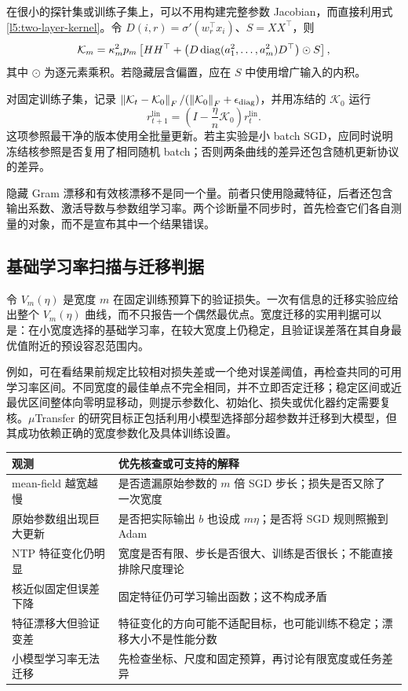 在很小的探针集或训练子集上，可以不用构建完整参数 Jacobian，而直接利用式 \eqref{l5:two-layer-kernel}。令
$D(i,r)=\sigma'(w_r^\top x_i)$、$S=XX^\top$，则
\begin{equation}
 \mathcal K_m
 =\kappa_m^2p_m
 \left[HH^\top+
 \left(D\operatorname{diag}(a_1^2,\ldots,a_m^2)D^\top\right)\odot S\right],
 \label{l5:kernel-computation}
\end{equation}
其中 $\odot$ 为逐元素乘积。若隐藏层含偏置，应在 $S$ 中使用增广输入的内积。

对固定训练子集，记录
$\left\lVert\mathcal K_t-\mathcal K_0\right\rVert_F/(\left\lVert\mathcal K_0\right\rVert_F+
\epsilon_{\mathrm{diag}})$，并用冻结的 $\mathcal K_0$ 运行
\[
 r_{t+1}^{\mathrm{lin}}
 =\left(I-\frac\eta n\mathcal K_0\right)r_t^{\mathrm{lin}}.
\]
这项参照最干净的版本使用全批量更新。若主实验是小 batch SGD，应同时说明冻结核参照是否复用了相同随机 batch；否则两条曲线的差异还包含随机更新协议的差异。

隐藏 Gram 漂移和有效核漂移不是同一个量。前者只使用隐藏特征，后者还包含输出系数、激活导数与参数组学习率。两个诊断量不同步时，首先检查它们各自测量的对象，而不是宣布其中一个结果错误。

\subsection{基础学习率扫描与迁移判据}

令 $V_m(\eta)$ 是宽度 $m$ 在固定训练预算下的验证损失。一次有信息的迁移实验应给出整个 $V_m(\eta)$ 曲线，而不只报告一个偶然最优点。宽度迁移的实用判据可以是：在小宽度选择的基础学习率，在较大宽度上仍稳定，且验证误差落在其自身最优值附近的预设容忍范围内。

例如，可在看结果前规定比较相对损失差或一个绝对误差阈值，再检查共同的可用学习率区间。不同宽度的最佳单点不完全相同，并不立即否定迁移；稳定区间或近最优区间整体向零明显移动，则提示参数化、初始化、损失或优化器约定需要复核。$\mu$Transfer 的研究目标正包括利用小模型选择部分超参数并迁移到大模型，但其成功依赖正确的宽度参数化及具体训练设置\citep{Yang2022}。

\begin{center}
\begin{tabularx}{\textwidth}{@{}p{}X@{}}
\toprule
观测 & 优先核查或可支持的解释 \\
\midrule
mean-field 越宽越慢 & 是否遗漏原始参数的 $m$ 倍 SGD 步长；损失是否又除了一次宽度 \\
原始参数组出现巨大更新 & 是否把实际输出 $b$ 也设成 $m\eta$；是否将 SGD 规则照搬到 Adam \\
NTP 特征变化仍明显 & 宽度是否有限、步长是否很大、训练是否很长；不能直接排除尺度理论 \\
核近似固定但误差下降 & 固定特征仍可学习输出函数；这不构成矛盾 \\
特征漂移大但验证变差 & 特征变化的方向可能不适配目标，也可能训练不稳定；漂移大小不是性能分数 \\
小模型学习率无法迁移 & 先检查坐标、尺度和固定预算，再讨论有限宽度或任务差异 \\
\bottomrule
\end{tabularx}
\end{center}

